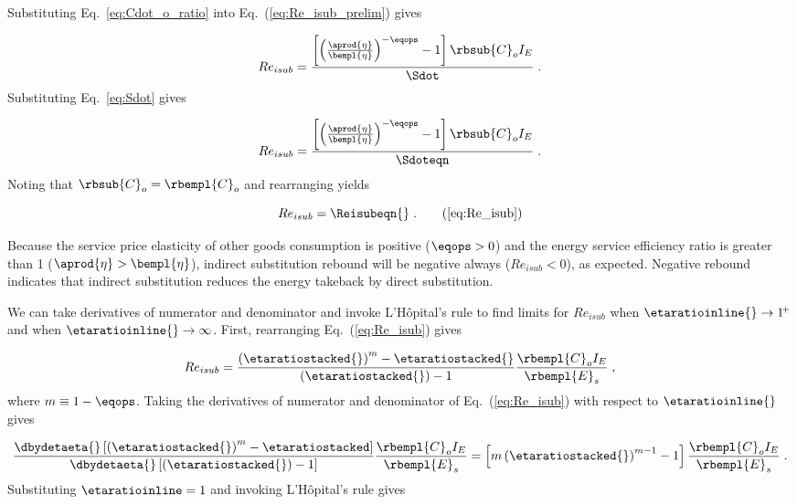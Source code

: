 Substituting Eq.~\ref{eq:Cdot_o_ratio} into Eq.~(\ref{eq:Re_isub_prelim}) gives

\begin{equation}
  Re_{isub} = \frac{\left[ \left( \frac{\aprod{\eta}}{\bempl{\eta}} \right)^{-\eqops} - 1  \right] \rbsub{C}_o I_E} {\Sdot} \; .
\end{equation}
%
Substituting Eq.~\ref{eq:Sdot} gives

\begin{equation}
  Re_{isub} = \frac{\left[ \left(\frac{\aprod{\eta}}{\bempl{\eta}} \right)
                  ^{-\eqops} - 1  \right] \rbsub{C}_o I_E}
                  {\Sdoteqn} \; .
\end{equation}
%
Noting that $\rbsub{C}_o = \rbempl{C}_o$ and rearranging yields

\begin{equation}
  Re_{isub} = \Reisubeqn{} \; . \tag{\ref{eq:Re_isub}}
\end{equation}

Because the service price elasticity of other goods consumption is positive ($\eqops > 0$) and
the energy service efficiency ratio is greater than 1 ($\aprod{\eta} > \bempl{\eta}$),
indirect substitution rebound will be negative always ($Re_{isub} < 0$),
as expected.
Negative rebound indicates that indirect substitution reduces the energy takeback by direct substitution.

We can take derivatives of numerator and denominator and
invoke L'H\^{o}pital's rule
to find limits for $Re_{isub}$ when
$\etaratioinline{} \to 1^{\! +}$ and when
$\etaratioinline{} \to \infty$.
First, rearranging Eq.~(\ref{eq:Re_isub}) gives

\begin{equation}
  Re_{isub} = \frac{\left( \etaratiostacked{} \right)^m - \etaratiostacked{}}{\left( \etaratiostacked{} \right) - 1} \frac{\rbempl{C}_o I_E}{\rbempl{E}_s} \; ,
\end{equation}
%
where $m \equiv 1 - \eqops$.
Taking the derivatives of numerator and denominator of Eq.~(\ref{eq:Re_isub})
with respect to $\etaratioinline{}$ gives

\begin{equation}
  \frac{\dbydetaeta{} \left[ \left( \etaratiostacked{} \right)^m - \etaratiostacked \right]}
            {\dbydetaeta{}\left[ \left( \etaratiostacked{} \right)  - 1 \right] } \frac{\rbempl{C}_o I_E}{\rbempl{E}_s} 
       = \left[ m \left( \etaratiostacked{} \right)^{m-1} - 1 \right] \frac{\rbempl{C}_o I_E}{\rbempl{E}_s} \; .
\end{equation}
%
Substituting $\etaratioinline = 1$ and invoking L'H\^{o}pital's rule gives

